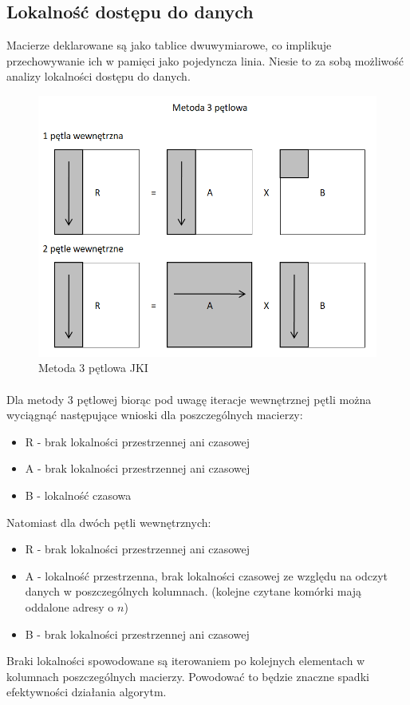 \documentclass{scrartcl}
\begin{document}
\subsection{Lokalność dostępu do danych}
Macierze deklarowane są jako tablice dwuwymiarowe, co implikuje przechowywanie ich w pamięci jako pojedyncza linia. Niesie to za sobą możliwość analizy lokalności dostępu do danych.
\begin{figure}[h]
\includegraphics[width=\textwidth]{3petlowa}
\caption{Metoda 3 pętlowa JKI}
\end{figure}
\paragraph{}
Dla metody 3 pętlowej biorąc pod uwagę iteracje wewnętrznej pętli można wyciągnąć następujące wnioski dla poszczególnych macierzy: \\
\begin{itemize}
\item R - brak lokalności przestrzennej ani czasowej
\item A - brak lokalności przestrzennej ani czasowej
\item B - lokalność czasowa
\end{itemize}
Natomiast dla dwóch pętli wewnętrznych:
\begin{itemize}
\item R - brak lokalności przestrzennej ani czasowej
\item A - lokalność przestrzenna, brak lokalności czasowej ze względu na odczyt danych w poszczególnych kolumnach. (kolejne czytane komórki mają oddalone adresy o $n$)
\item B - brak lokalności przestrzennej ani czasowej
\end{itemize}
Braki lokalności spowodowane są iterowaniem po kolejnych elementach w kolumnach poszczególnych macierzy. Powodować to będzie znaczne spadki efektywności działania algorytm.
\end{document}
